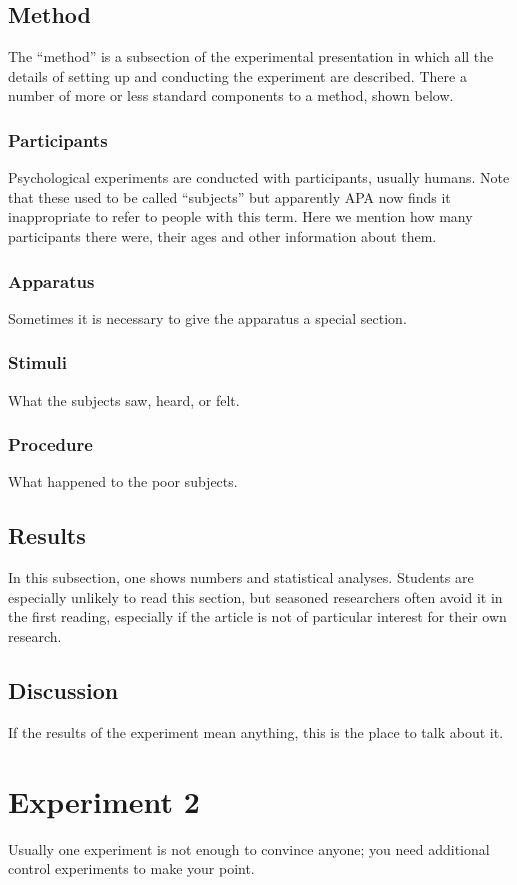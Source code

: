 \documentclass[man]{apa}
\begin{document}
\subsection{Method}
The ``method'' is a subsection of the experimental presentation in which all the details of setting up and conducting the experiment are described.  There a number of more or less standard components to a method, shown below.
\subsubsection{Participants}
Psychological experiments are conducted with participants, usually humans. Note that these used to be called ``subjects'' but apparently APA now finds it inappropriate to refer to people with this term.  Here we mention how many participants there were, their ages and other information about them.
\subsubsection{Apparatus}
Sometimes it is necessary to give the apparatus a special section.
\subsubsection{Stimuli}
What the subjects saw, heard, or felt.
\subsubsection{Procedure}
What happened to the poor subjects.
\subsection{Results}
In this subsection, one shows numbers and statistical analyses.  Students are especially unlikely to read this section, but seasoned researchers often avoid it in the first reading, especially if the article is not of particular interest for their own research.
\subsection{Discussion}
If the results of the experiment mean anything, this is the place to talk about it. 

\section{Experiment 2}
Usually one experiment is not enough to convince anyone; you need additional control experiments to make your point.
\end{document}
